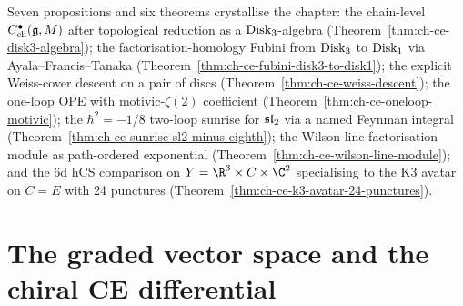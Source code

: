 Seven propositions and six theorems crystallise the chapter:
the chain-level \(C^\bullet_{\mathrm{ch}}(\mathfrak{g},M)\) after topological
reduction as a \(\mathrm{Disk}_3\)-algebra
(Theorem~\ref{thm:ch-ce-disk3-algebra});
the factorisation-homology Fubini from $\mathrm{Disk}_3$ to $\mathrm{Disk}_1$ via
Ayala--Francis--Tanaka
(Theorem~\ref{thm:ch-ce-fubini-disk3-to-disk1});
the explicit Weiss-cover descent on a pair of discs
(Theorem~\ref{thm:ch-ce-weiss-descent});
the one-loop OPE with motivic-$\zeta(2)$ coefficient
(Theorem~\ref{thm:ch-ce-oneloop-motivic});
the $\hbar^2 = -1/8$ two-loop sunrise for $\mathfrak{sl}_2$ via a named
Feynman integral
(Theorem~\ref{thm:ch-ce-sunrise-sl2-minus-eighth});
the Wilson-line factorisation module as path-ordered exponential
(Theorem~\ref{thm:ch-ce-wilson-line-module});
and the 6d hCS comparison on $Y=\R^3\times C\times\C^2$ specialising
to the K3 avatar on $C=E$ with 24 punctures
(Theorem~\ref{thm:ch-ce-k3-avatar-24-punctures}).

\section{The graded vector space and the chiral CE differential}
\label{sec:ch-ce-graded-vs-differential}

